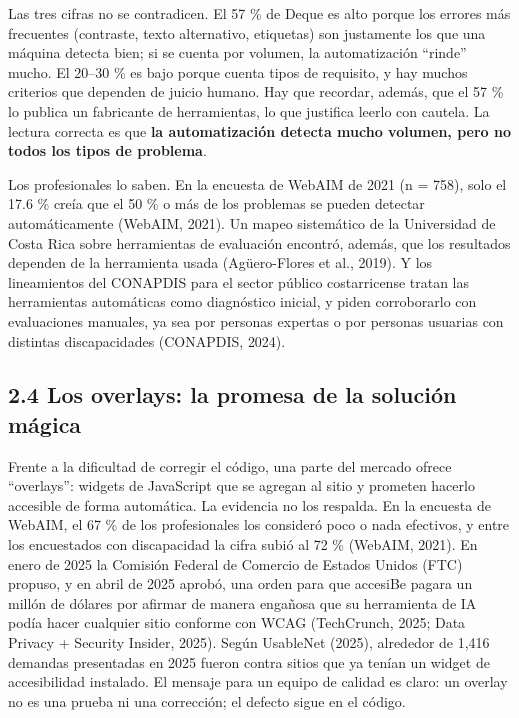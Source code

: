 \documentclass[10pt,letterpaper,onecolumn]{IEEEtran}
\begin{document}
Las tres cifras no se contradicen. El 57 \% de Deque es alto porque los errores más frecuentes (contraste, texto alternativo, etiquetas) son justamente los que una máquina detecta bien; si se cuenta por volumen, la automatización ``rinde'' mucho. El 20--30 \% es bajo porque cuenta tipos de requisito, y hay muchos criterios que dependen de juicio humano. Hay que recordar, además, que el 57 \% lo publica un fabricante de herramientas, lo que justifica leerlo con cautela. La lectura correcta es que \textbf{la automatización detecta mucho volumen, pero no todos los tipos de problema}.

Los profesionales lo saben. En la encuesta de WebAIM de 2021 (n = 758), solo el 17.6 \% creía que el 50 \% o más de los problemas se pueden detectar automáticamente (WebAIM, 2021). Un mapeo sistemático de la Universidad de Costa Rica sobre herramientas de evaluación encontró, además, que los resultados dependen de la herramienta usada (Agüero-Flores et al., 2019). Y los lineamientos del CONAPDIS para el sector público costarricense tratan las herramientas automáticas como diagnóstico inicial, y piden corroborarlo con evaluaciones manuales, ya sea por personas expertas o por personas usuarias con distintas discapacidades (CONAPDIS, 2024).

\subsection{2.4 Los overlays: la promesa de la solución mágica}\label{los-overlays-la-promesa-de-la-soluciuxf3n-muxe1gica}

Frente a la dificultad de corregir el código, una parte del mercado ofrece ``overlays'': widgets de JavaScript que se agregan al sitio y prometen hacerlo accesible de forma automática. La evidencia no los respalda. En la encuesta de WebAIM, el 67 \% de los profesionales los consideró poco o nada efectivos, y entre los encuestados con discapacidad la cifra subió al 72 \% (WebAIM, 2021). En enero de 2025 la Comisión Federal de Comercio de Estados Unidos (FTC) propuso, y en abril de 2025 aprobó, una orden para que accesiBe pagara un millón de dólares por afirmar de manera engañosa que su herramienta de IA podía hacer cualquier sitio conforme con WCAG (TechCrunch, 2025; Data Privacy + Security Insider, 2025). Según UsableNet (2025), alrededor de 1,416 demandas presentadas en 2025 fueron contra sitios que ya tenían un widget de accesibilidad instalado. El mensaje para un equipo de calidad es claro: un overlay no es una prueba ni una corrección; el defecto sigue en el código.
\end{document}
